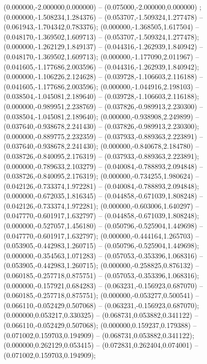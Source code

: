  (0.000000,-2.000000,0.000000) -- (0.075000,-2.000000,0.000000) ;
 (0.000000,-1.508234,1.284376) -- (0.053707,-1.509324,1.277478) -- (0.061943,-1.704342,0.783376);
 (0.000000,-1.368505,1.617504) -- (0.048170,-1.369502,1.609713) -- (0.053707,-1.509324,1.277478);
 (0.000000,-1.262129,1.849137) -- (0.044316,-1.262939,1.840942) -- (0.048170,-1.369502,1.609713);
 (0.000000,-1.177090,2.011967) -- (0.041605,-1.177686,2.003596) -- (0.044316,-1.262939,1.840942);
 (0.000000,-1.106226,2.124628) -- (0.039728,-1.106603,2.116188) -- (0.041605,-1.177686,2.003596);
 (0.000000,-1.044916,2.198103) -- (0.038504,-1.045081,2.189640) -- (0.039728,-1.106603,2.116188);
 (0.000000,-0.989951,2.238769) -- (0.037826,-0.989913,2.230300) -- (0.038504,-1.045081,2.189640);
 (0.000000,-0.938908,2.249899) -- (0.037640,-0.938678,2.241430) -- (0.037826,-0.989913,2.230300);
 (0.000000,-0.889775,2.232359) -- (0.037933,-0.889363,2.223891) -- (0.037640,-0.938678,2.241430);
 (0.000000,-0.840678,2.184780) -- (0.038726,-0.840095,2.176319) -- (0.037933,-0.889363,2.223891);
 (0.000000,-0.789633,2.103279) -- (0.040084,-0.788893,2.094848) -- (0.038726,-0.840095,2.176319);
 (0.000000,-0.734255,1.980624) -- (0.042126,-0.733374,1.972281) -- (0.040084,-0.788893,2.094848);
 (0.000000,-0.672035,1.816345) -- (0.044858,-0.671039,1.808248) -- (0.042126,-0.733374,1.972281);
 (0.000000,-0.603006,1.640297) -- (0.047770,-0.601917,1.632797) -- (0.044858,-0.671039,1.808248);
 (0.000000,-0.527057,1.456180) -- (0.050796,-0.525904,1.449698) -- (0.047770,-0.601917,1.632797);
 (0.000000,-0.444164,1.265703) -- (0.053905,-0.442983,1.260715) -- (0.050796,-0.525904,1.449698);
 (0.000000,-0.354563,1.071283) -- (0.057053,-0.353396,1.068316) -- (0.053905,-0.442983,1.260715);
 (0.000000,-0.258825,0.876132) -- (0.060185,-0.257718,0.875751) -- (0.057053,-0.353396,1.068316);
 (0.000000,-0.157921,0.684283) -- (0.063231,-0.156923,0.687070) -- (0.060185,-0.257718,0.875751);
 (0.000000,-0.053277,0.500541) -- (0.066110,-0.052429,0.507068) -- (0.063231,-0.156923,0.687070);
 (0.000000,0.053217,0.330325) -- (0.068731,0.053882,0.341122) -- (0.066110,-0.052429,0.507068);
 (0.000000,0.159237,0.179388) -- (0.071002,0.159703,0.194909) -- (0.068731,0.053882,0.341122);
 (0.000000,0.262129,0.053415) -- (0.072831,0.262404,0.074001) -- (0.071002,0.159703,0.194909);
